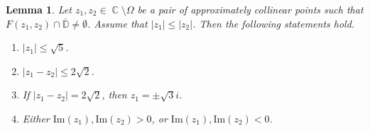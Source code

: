 \documentclass{amsart}
\numberwithin{equation}{section}
\newtheorem{lemma}[theorem]{Lemma}
\theoremstyle{definition}
\theoremstyle{remark}
\DeclareMathOperator{\CC}{\mathbb C}
\begin{document}
	
	\begin{lemma}\label{lemPropertiesOfIntersectingCirclesBasic}
		Let $z_1,z_2 \in \CC \setminus \Omega$ be a pair of approximately collinear points such that $F(z_1,z_2) \cap \overline{\mathbb D} \ne \emptyset$. Assume that $|z_1| \le |z_2|$. Then the following statements hold.
		\begin{enumerate}[label=(\roman*)]
			\item\label{CirclePropertyi} $|z_1| \le \sqrt{5}$.
			\item\label{CirclePropertyii} $|z_1 - z_2| \le 2\sqrt{2}$.
			\item\label{CirclePropertyiii} If $|z_1 - z_2| = 2\sqrt{2}$, then $z_1 = \pm \sqrt{3}i$.
			\item\label{CirclePropertyiv} Either $\mathrm{Im}(z_1), \mathrm{Im}(z_2) > 0$, or $\mathrm{Im}(z_1), \mathrm{Im}(z_2) < 0$.
		\end{enumerate}
	\end{lemma}
\end{document}
